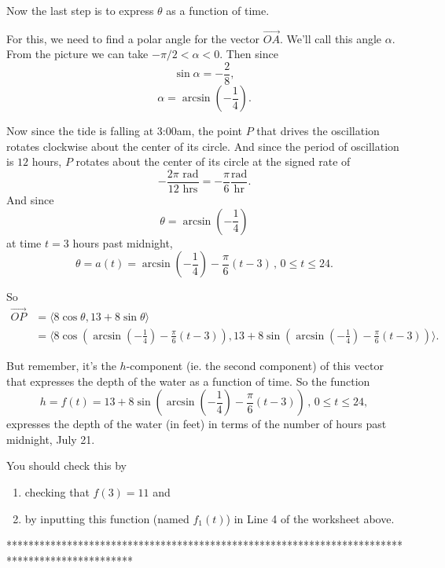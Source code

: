 \documentclass{ximera}
\begin{document}
\begin{question}
Now the last step is to express $\theta$ as a function of time.

For this, we need to find a polar angle for the vector $\overrightarrow{OA}$. We'll call this angle $\alpha$. From the picture we can take $-\pi/2 < \alpha < 0$. Then since
\[
    \sin \alpha = -\frac{2}{8} ,
\] 
\[
 \alpha = \arcsin \left(-\frac{1}{4}\right) .
\]

Now since the tide is falling at 3:00am, the point $P$ that drives the oscillation rotates clockwise about the center of its circle. And since the period of oscillation is $12$ hours, $P$ rotates about the center of its circle at the signed rate of
\[
     - \frac{2\pi \text{ rad}}{12\text{ hrs}} = - \frac{\pi}{6} \frac{\text{rad}}{\text{hr}} .
\]
And since 
\[
  \theta=\arcsin \left(-\frac{1}{4}\right)
\]
at time $t=3$ hours past midnight,
\[
  \theta = a(t) = \arcsin \left(-\frac{1}{4}\right) -  \frac{\pi}{6} \left(t-3\right) \, , \, 0\leq t \leq 24.
\]

So
\begin{align*}
    \overrightarrow{OP} & = \langle  8\cos\theta, 13 + 8 \sin\theta \rangle \\
                                  & = \langle  8\cos \left(  \arcsin \left(-\frac{1}{4}\right) -  \frac{\pi}{6} \left(t-3\right) \right), 13 + 8 \sin \left( \arcsin \left(-\frac{1}{4}\right) -  \frac{\pi}{6} \left(t-3\right) \right) \rangle .
\end{align*}

But remember, it's the $h$-component (ie. the second component) of this vector that expresses the depth of the water as a function of time. So the function 
\[
   h = f(t) =  13 + 8 \sin \left( \arcsin \left(-\frac{1}{4}\right) -  \frac{\pi}{6} \left(t-3\right) \right) \, , \, 0\leq t \leq  24,
\]
expresses the depth of the water (in feet) in terms of the number of hours past midnight, July 21.

You should check this by 
\begin{enumerate}

\item checking that $f(3) = 11$ and

\item by inputting this function (named $f_1(t)$) in Line 4 of the worksheet above.

\end{enumerate}
\end{question}

***********************************************************************************************
\fi
\end{document}
